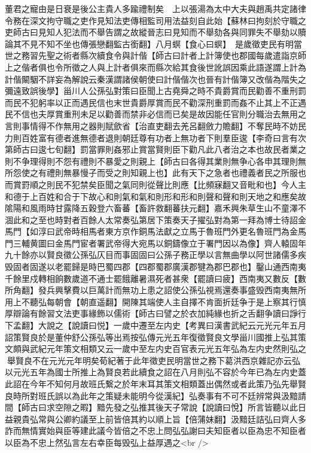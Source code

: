 董君之寵由是日衰是後公主貴人多踰禮制矣　上以張湯為太中大夫與趙禹共定諸律令務在深文拘守職之吏作見知法吏傳相監司用法益刻自此始【蘇林曰拘刻於守職之吏師古曰見知人犯法而不舉告謂之故縱晉志曰見知而不舉劾各與同罪失不舉劾以贖論其不見不知不坐也傳張戀翻監古銜翻】八月螟【食心曰螟】　是歲徵吏民有明當世之務習先聖之術者縣次續食令與計偕【師古曰計者上計簿使也郡國每歲遣詣京師上之偕者俱也令所徵之人與上計者俱來而縣次給其食後世訛誤因乘此語遂謂上計為計偕闞駰不詳妄為解說云秦漢謂諸侯朝使曰計偕偕次也晉有計偕簿又改偕為階失之彌遠致誤後學】甾川人公孫弘對策曰臣聞上古堯舜之時不貴爵賞而民勸善不重刑罰而民不犯躬率以正而遇民信也末世貴爵厚賞而民不勸深刑重罰而姦不止其上不正遇民不信也夫厚賞重刑未足以勸善而禁非必信而已矣是故因能任官則分職治去無用之言則事情得不作無用之器則賦歛省【治直吏翻去羌呂翻斂力贍翻】不奪民時不妨民力則百姓富有德者進無德者退則朝廷尊有功者上無功者下則羣臣逡【李奇曰言有次第師古曰逡七旬翻】罰當罪則姦邪止賞當賢則臣下勸凡此八者治之本也故民者業之則不争理得則不怨有禮則不暴愛之則親上【師古曰各得其業則無争心各申其理則無所怨使之有禮則無暴慢子而受之則知親上也】此有天下之急者也禮義者民之所服也而賞罸順之則民不犯禁矣臣聞之氣同則從聲比則應【比頻寐翻又音毗和也】今人主和德于上百姓和合于下故心和則氣和氣和則形和形和則聲和聲和則天地之和應矣故隂陽和風雨時甘露降五穀登六畜蕃【畜許救翻蕃扶元翻】嘉禾興朱草生山不童澤不涸此和之至也時對者百餘人太常奏弘第居下策奏天子擢弘對為第一拜為博士待詔金馬門【如淳曰武帝時相馬者東方京作銅馬法獻之立馬于魯班門外更名魯班門為金馬門三輔黄圖曰金馬門宦者署武帝得大宛馬以銅鑄像立于署門因以為像】齊人轅固年九十餘亦以賢良徵公孫弘仄目而事固固曰公孫子務正學以言無曲學以阿世諸儒多疾毁固者固遂以老罷歸是時巴蜀四郡【四郡蜀郡廣漢郡犍為郡巴郡也】鑿山通西南夷千餘里戍轉相餉數歲道不通士罷餓離暑濕死者甚衆【罷讀曰疲】西南夷又數反【數所角翻】發兵興擊費以巨萬計而無功上患之詔使公孫弘視焉還奏事盛毁西南夷無所用上不聽弘每朝會【朝直遥翻】開陳其端使人主自擇不肯面折廷争于是上察其行慎厚辯論有餘習文法吏事緣飾以儒術【師古曰譬之於衣加純緣也折之舌翻争讀曰諍行下孟翻】大說之【說讀曰悦】一歲中遷至左内史【考異曰漢書武紀云元光元年五月詔策賢良於是董仲舒公孫弘等出焉按弘傳元光五年復徵賢良文學甾川國推上弘其策文頗與武紀元年策文相類又云一歲中至左内史百官表元光五年弘為左内史然則弘之舉賢良不在元光元年明矣荀紀著于此年徵吏民明當世之務下葛洪西京雜記亦云弘以元光五年為國士所推上為賢良若此續食之詔在八月則弘不容於今年已為左内史蓋此詔在今年不知何月故班氏繋之於年末耳其策文相類蓋出偶然或者此策乃弘先舉賢良時所對班氏誤以為此年之策疑未能明今從漢紀】弘奏事有不可不廷辨常與汲黯請間【師古曰求空隙之暇】黯先發之弘推其後天子常說【說讀曰悅】所言皆聽以此日益親貴弘常與公卿約議至上前皆倍其約以順上旨【倍蒲妹翻】汲黯廷詰弘曰齊人多詐而無情實始與臣等建此議今皆倍之不忠上問弘弘謝曰夫知臣者以臣為忠不知臣者以臣為不忠上然弘言左右幸臣每毁弘上益厚遇之<br />
